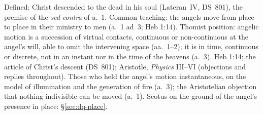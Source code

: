  {Defined: Christ descended to the dead in his soul (Lateran~IV,
 DS~801), the premise of the \emph{sed contra} of a.~1. Common teaching:
 the angels move from place to place in their ministry to men (a.~1 ad~3;
 Heb 1:14). Thomist position: angelic motion is a succession of virtual
 contacts, continuous or non-continuous at the angel's will, able to omit
 the intervening space (aa.~1--2); it is in time, continuous or discrete,
 not in an instant nor in the time of the heavens (a.~3).}
 {Heb 1:14; the article of Christ's descent (DS~801); Aristotle,
 \emph{Physics} III--VI (objections and replies throughout).}
 {Those who held the angel's motion instantaneous, on the model of
 illumination and the generation of fire (a.~3); the Aristotelian
 objection that nothing indivisible can be moved (a.~1). Scotus on the
 ground of the angel's presence in place: \S\ref{sec:dq-place}.}

